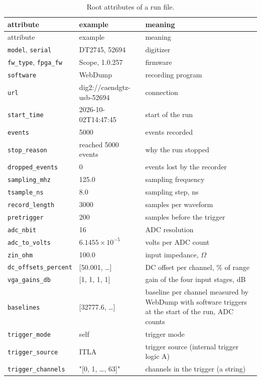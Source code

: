 \documentclass[11pt]{article}
\newcommand{\code}[1]{\texttt{#1}}
\begin{document}
\begin{longtable}{l l p{72mm}}
\caption{Root attributes of a run file.}\label{tab:attrs}\\
\toprule
attribute & example & meaning \\
\midrule
\endfirsthead
\toprule
attribute & example & meaning \\
\midrule
\endhead
\code{model}, \code{serial}  & DT2745, 52694 & digitizer \\
\code{fw\_type}, \code{fpga\_fw} & Scope, 1.0.257 & firmware \\
\code{software}             & WebDump & recording program \\
\code{url}                  & dig2://caendgtz-usb-52694 & connection \\
\code{start\_time}          & 2026-10-02T14:47:45 & start of the run \\
\code{events}               & 5000 & events recorded \\
\code{stop\_reason}         & reached 5000 events & why the run stopped \\
\code{dropped\_events}      & 0 & events lost by the recorder \\
\code{sampling\_mhz}        & 125.0 & sampling frequency \\
\code{tsample\_ns}          & 8.0 & sampling step, ns \\
\code{record\_length}       & 3000 & samples per waveform \\
\code{pretrigger}           & 200 & samples before the trigger \\
\code{adc\_nbit}            & 16 & ADC resolution \\
\code{adc\_to\_volts}       & $6.1455\times10^{-5}$ & volts per ADC count \\
\code{zin\_ohm}             & 100.0 & input impedance, $\Omega$ \\
\code{dc\_offsets\_percent} & [50.001, \dots] & DC offset per channel, \% of range \\
\code{vga\_gains\_db}       & [1, 1, 1, 1] & gain of the four input stages, dB \\
\code{baselines}            & [32777.6, \dots] & baseline per channel measured by WebDump with software triggers at the start of the run, ADC counts \\
\code{trigger\_mode}        & self & trigger mode \\
\code{trigger\_source}      & ITLA & trigger source (internal trigger logic A) \\
\code{trigger\_channels}    & "[0, 1, \dots, 63]" & channels in the trigger (a string) \\

\end{longtable}
\end{document}
